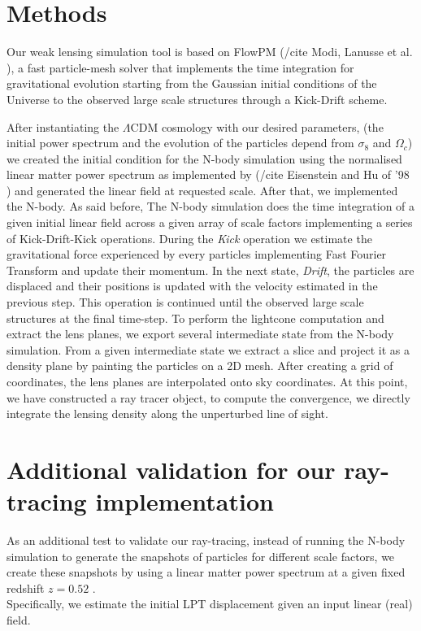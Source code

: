 \documentclass[twocolumn,twocolappendix]{aastex63}
\begin{document}


\section{Methods}

Our weak lensing simulation tool is based on FlowPM (/cite Modi, Lanusse et al. ), a fast particle-mesh solver that implements the time integration for gravitational evolution starting from the Gaussian initial conditions of the Universe to the observed large scale structures through a Kick-Drift scheme.


After instantiating the $\Lambda$CDM cosmology with our desired parameters, (the initial power spectrum and the evolution of the particles depend from $\sigma_8$ and $\Omega_{c}$) we created the initial condition for the N-body simulation using the normalised linear matter power spectrum as implemented by (/cite Eisenstein and Hu of '98 ) and generated the linear field at requested scale. After that, we implemented the N-body. As said before, The N-body simulation does the time integration of a given initial linear field  across a given array of scale factors implementing a series of Kick-Drift-Kick operations. 
During the \textit{Kick} operation we estimate the gravitational force experienced by every particles implementing Fast Fourier Transform and update their momentum. In the next state, \textit{Drift}, the particles are displaced and their positions is updated with the velocity estimated in the previous step. This operation is continued until the observed large scale structures at the final time-step.
To perform the lightcone computation and extract the lens planes,  we export several intermediate state from the N-body simulation. From a given intermediate state we extract a slice and project it as a density plane by painting the particles on a 2D mesh. 
After creating a grid of coordinates, the lens planes are interpolated onto sky coordinates. 
 At this point, we have constructed a ray tracer object, to compute the convergence, we directly integrate the lensing density along the unperturbed line of sight. 

    
\section{Additional validation for our ray-tracing implementation } 
As an additional test to validate our ray-tracing, instead of running the N-body simulation to generate the snapshots of particles for different scale factors, we create these snapshots by using a linear matter power spectrum at a given fixed redshift $z=0.52$ . \\
Specifically, we estimate the initial LPT displacement given an input linear (real) field.
\end{document}
